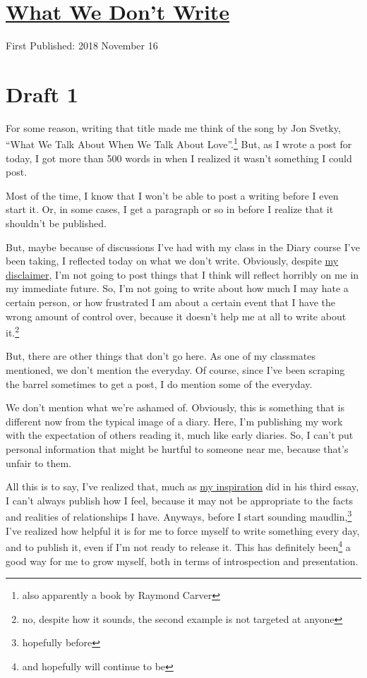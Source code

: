 \documentclass[12pt]{article}[titlepage]
\newcommand{\say}[1]{``#1''}
\newcommand{\1}{\={a}}
\newcommand{\2}{\={e}}
\newcommand{\3}{\={\i}}
\newcommand{\4}{\=o}
\newcommand{\5}{\=u}
\newcommand{\6}{\={A}}
\renewcommand{\,}{\textsuperscript{,}}
\begin{document}
\doublespacing
\section{\href{what-we-dont-write.html}{What We Don't Write}}
First Published: 2018 November 16
\section{Draft 1}
For some reason, writing that title made me think of the song by Jon Svetky, \say{What We Talk About When We Talk About Love}.\footnote{also apparently a book by Raymond Carver}
But, as I wrote a post for today, I got more than 500 words in when I realized it wasn't something I could post.

Most of the time, I know that I won't be able to post a writing before I even start it.
Or, in some cases, I get a paragraph or so in before I realize that it shouldn't be published.

But, maybe because of discussions I've had with my class in the Diary course I've been taking, I reflected today on what we don't write.
Obviously, despite \href{disclaimer.html}{my disclaimer}, I'm not going to post things that I think will reflect horribly on me in my immediate future.
So, I'm not going to write about how much I may hate a certain person, or how frustrated I am about a certain event that I have the wrong amount of control over, because it doesn't help me at all to write about it.\footnote{no, despite how it sounds, the second example is not targeted at anyone}

But, there are other things that don't go here.
As one of my classmates mentioned, we don't mention the everyday.
Of course, since I've been scraping the barrel sometimes to get a post, I do mention some of the everyday.

We don't mention what we're ashamed of.
Obviously, this is something that is different now from the typical image of a diary.
Here, I'm publishing my work with the expectation of others reading it, much like early diaries.
So, I can't put personal information that might be hurtful to someone near me, because that's unfair to them.

All this is to say, I've realized that, much as \href{http://www.cs.grinnell.edu/~rebelsky/musings/}{my inspiration} did in his third essay, I can't always publish how I feel, because it may not be appropriate to the facts and realities of relationships I have.
Anyways, before I start sounding maudlin,\footnote{hopefully before} I've realized how helpful it is for me to force myself to write something every day, and to publish it, even if I'm not ready to release it.
This has definitely been\footnote{and hopefully will continue to be} a good way for me to grow myself, both in terms of introspection and presentation.
\end{document}
